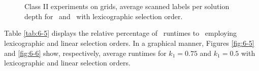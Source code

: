 \begin{figure}
    \begin{center}
%
      \\ %
\vspace{0.025\textwidth}      
		\\ %
    \end{center}
    \vspace{-0.25in} 
    \caption{%
Class II experiments on grids, average scanned labels per solution depth for \namoa \ and \lexgo \ with lexicographic selection order.  
    }%
    \label{fig:6-4}
\end{figure}

Table \ref{tab:6-5} displays the relative percentage of \lexgo \ runtimes to \namoa \ employing lexicographic and linear selection orders. In a graphical manner, Figures \ref{fig:6-5} and \ref{fig:6-6} show, respectively, average runtimes for  $k_1 = 0.75$ and $k_1 = 0.5$ with lexicographic and linear selection orders.

